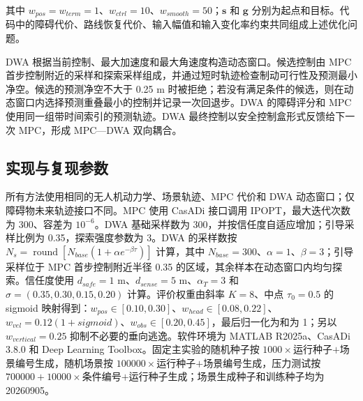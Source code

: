 \documentclass[10pt,a4paper,twocolumn]{ctexart}
\begin{document}
其中 $w_{pos}=w_{term}=1$、$w_{ctrl}=10$、$w_{smooth}=50$；$\mathbf s$ 和 $\mathbf g$ 分别为起点和目标。代码中的障碍代价、路线恢复代价、输入幅值和输入变化率约束共同组成上述优化问题。

DWA 根据当前控制、最大加速度和最大角速度构造动态窗口。候选控制由 MPC 首步控制附近的采样和探索采样组成，并通过短时轨迹检查制动可行性及预测最小净空。候选的预测净空不大于 0.25 m 时被拒绝；若没有满足条件的候选，则在动态窗口内选择预测重叠最小的控制并记录一次回退步。DWA 的障碍评分和 MPC 使用同一组带时间索引的预测轨迹。DWA 最终控制以安全控制盒形式反馈给下一次 MPC，形成 MPC—DWA 双向耦合。

\subsection{实现与复现参数}

所有方法使用相同的无人机动力学、场景轨迹、MPC 代价和 DWA 动态窗口；仅障碍物未来轨迹接口不同。MPC 使用 CasADi 接口调用 IPOPT，最大迭代次数为 300、容差为 $10^{-6}$。DWA 基础采样数为 300，并按信任度自适应增加；引导采样比例为 0.35，探索强度参数为 3。DWA 的采样数按 $N_s=\operatorname{round}[N_{base}(1+\alpha e^{-\beta\tau})]$ 计算，其中 $N_{base}=300$、$\alpha=1$、$\beta=3$；引导采样位于 MPC 首步控制附近半径 0.35 的区域，其余样本在动态窗口内均匀探索。信任度使用 $d_{safe}=1$ m、$d_{sense}=5$ m、$\alpha_T=3$ 和 $\sigma=(0.35,0.30,0.15,0.20)$ 计算。评价权重由斜率 $K=8$、中点 $\tau_0=0.5$ 的 sigmoid 映射得到：$w_{pos}\in[0.10,0.30]$、$w_{head}\in[0.08,0.22]$、$w_{vel}=0.12(1+sigmoid)$、$w_{obs}\in[0.20,0.45]$，最后归一化为和为 1；另以 $w_{vertical}=0.25$ 抑制不必要的垂向逃逸。软件环境为 MATLAB R2025a、CasADi 3.8.0 和 Deep Learning Toolbox。固定主实验的随机种子按 $1000\times$运行种子$+$场景编号生成，随机场景按 $100000\times$运行种子$+$场景编号生成，压力测试按 $700000+10000\times$条件编号$+$运行种子生成；场景生成种子和训练种子均为 20260905。
\end{document}
